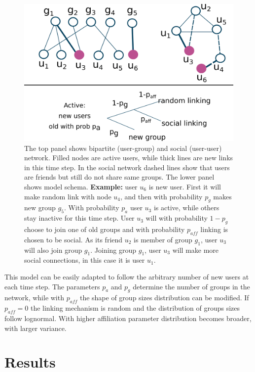 \begin{figure}[h!]
	\centering
	\includegraphics[scale=0.5]{Figures/test.png}
	\caption{The top panel shows bipartite (user-group) and social (user-user) network. Filled nodes are active users, while thick lines are new links in this time step. In the social network dashed lines show that users are friends but still do not share same groups. The lower panel shows model schema. \textbf{Example:} user $u_6$ is new user. First it will make random link  with node $u_4$, and then with probability $p_g$ makes new group $g_5$. With probability $p_a$ user $u_3$ is active, while others stay inactive for this time step. User $u_3$ will with probability $1-p_g$ choose to join one of old groups and with probability $p_{aff}$ linking is chosen to be social. As its friend $u_2$ is member of group $g_1$, user $u_3$ will also join group $g_1$. Joining group $g_1$, user $u_3$ will make more social connections, in this case it is user $u_1$.}
	\label{fig:my_label}
\end{figure}

This model can be easily adapted to follow the arbitrary number of new users at each time step. The parameters $p_a$ and $p_g$ determine the number of groups in the network, while with $p_{aff}$ the shape of group sizes distribution can be modified. If  $p_{aff}=0$ the linking mechanism is random and the distribution of groups sizes follow lognormal. With higher affiliation parameter distribution becomes broader, with larger variance. 


\section{Results \label{sec:results}}

